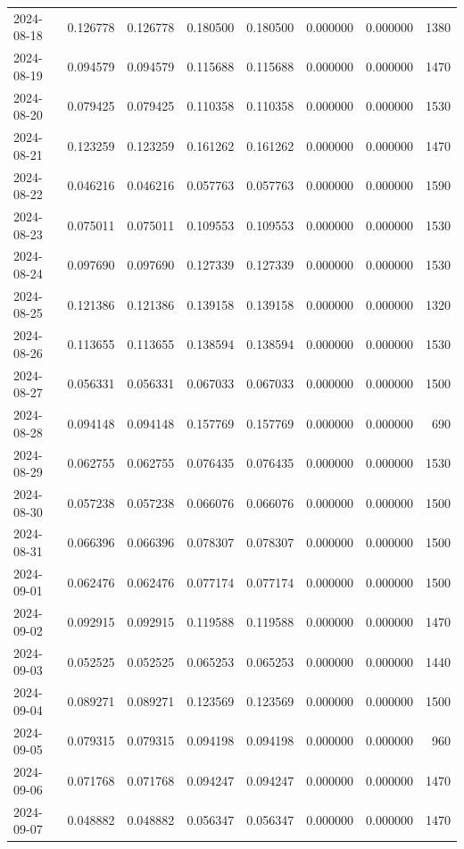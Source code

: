 \begin{tabular}{lrrrrrrr}
2024-08-18 & 0.126778 & 0.126778 & 0.180500 & 0.180500 & 0.000000 & 0.000000 & 1380 \\
2024-08-19 & 0.094579 & 0.094579 & 0.115688 & 0.115688 & 0.000000 & 0.000000 & 1470 \\
2024-08-20 & 0.079425 & 0.079425 & 0.110358 & 0.110358 & 0.000000 & 0.000000 & 1530 \\
2024-08-21 & 0.123259 & 0.123259 & 0.161262 & 0.161262 & 0.000000 & 0.000000 & 1470 \\
2024-08-22 & 0.046216 & 0.046216 & 0.057763 & 0.057763 & 0.000000 & 0.000000 & 1590 \\
2024-08-23 & 0.075011 & 0.075011 & 0.109553 & 0.109553 & 0.000000 & 0.000000 & 1530 \\
2024-08-24 & 0.097690 & 0.097690 & 0.127339 & 0.127339 & 0.000000 & 0.000000 & 1530 \\
2024-08-25 & 0.121386 & 0.121386 & 0.139158 & 0.139158 & 0.000000 & 0.000000 & 1320 \\
2024-08-26 & 0.113655 & 0.113655 & 0.138594 & 0.138594 & 0.000000 & 0.000000 & 1530 \\
2024-08-27 & 0.056331 & 0.056331 & 0.067033 & 0.067033 & 0.000000 & 0.000000 & 1500 \\
2024-08-28 & 0.094148 & 0.094148 & 0.157769 & 0.157769 & 0.000000 & 0.000000 & 690 \\
2024-08-29 & 0.062755 & 0.062755 & 0.076435 & 0.076435 & 0.000000 & 0.000000 & 1530 \\
2024-08-30 & 0.057238 & 0.057238 & 0.066076 & 0.066076 & 0.000000 & 0.000000 & 1500 \\
2024-08-31 & 0.066396 & 0.066396 & 0.078307 & 0.078307 & 0.000000 & 0.000000 & 1500 \\
2024-09-01 & 0.062476 & 0.062476 & 0.077174 & 0.077174 & 0.000000 & 0.000000 & 1500 \\
2024-09-02 & 0.092915 & 0.092915 & 0.119588 & 0.119588 & 0.000000 & 0.000000 & 1470 \\
2024-09-03 & 0.052525 & 0.052525 & 0.065253 & 0.065253 & 0.000000 & 0.000000 & 1440 \\
2024-09-04 & 0.089271 & 0.089271 & 0.123569 & 0.123569 & 0.000000 & 0.000000 & 1500 \\
2024-09-05 & 0.079315 & 0.079315 & 0.094198 & 0.094198 & 0.000000 & 0.000000 & 960 \\
2024-09-06 & 0.071768 & 0.071768 & 0.094247 & 0.094247 & 0.000000 & 0.000000 & 1470 \\
2024-09-07 & 0.048882 & 0.048882 & 0.056347 & 0.056347 & 0.000000 & 0.000000 & 1470 \\

\end{tabular}
